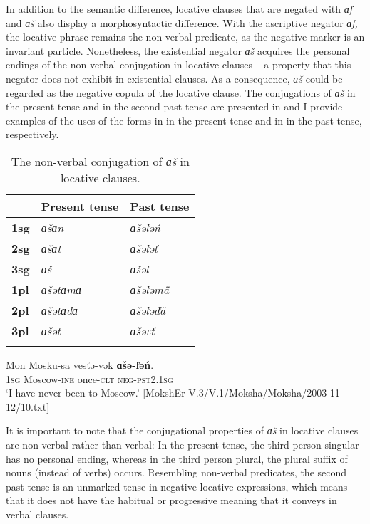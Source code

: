 \documentclass[output=paper]{langsci/langscibook}
\begin{document}
  In addition to the semantic difference, locative clauses that are negated with \textit{ɑf} and \textit{ɑš} also display a morphosyntactic difference. With the ascriptive negator \textit{ɑf,} the locative phrase remains the non-verbal predicate, as the negative marker is an invariant particle. Nonetheless, the existential negator \textit{ɑš} acquires the personal endings of the non-verbal conjugation in locative clauses -- a property that this negator does not exhibit in existential clauses. As a consequence, \textit{ɑš} could be regarded as the negative copula of the locative clause. The conjugations of \textit{ɑš} in the present tense and in the second past tense are presented in  and I provide examples of the uses of the forms in  in the present tense and in  in the past tense, respectively.

\begin{table}
\caption{The non-verbal conjugation of \textit{ɑš} in locative clauses.}
\label{tab:2:5}
\begin{tabularx}{.5\textwidth}{l Q Q}
\lsptoprule
			&\textbf{Present tense}	&\textbf{Past tense}\\
\midrule
\textbf{1sg}	&\textit{ɑšɑn}			&\textit{ɑšəľəń}\\
\textbf{2sg}	&\textit{ɑšɑt}			&\textit{ɑšəľəť}\\
\textbf{3sg}	&\textit{ɑš}			&\textit{ɑšəľ}\\
\textbf{1pl}	&\textit{ɑšətɑmɑ}		&\textit{ɑšəľəmä}\\
\textbf{2pl}	&\textit{ɑšətɑdɑ}		&\textit{ɑšəľəďä}\\
\textbf{3pl}	&\textit{ɑšət}			&\textit{ɑšə\textsc{ľ}ť}\\
\lspbottomrule
\end{tabularx}
\end{table}

\ea\label{ex:moksha-never-Moscow}
\gll Mon Mosku-sa vesťə-vək \textbf{ɑšə-ľəń}.\\
\textsc{1sg} Moscow-\textsc{ine} once-\textsc{clt} \textsc{neg-pst2.1sg}\\
\glt `I have never been to Moscow.' [MokshEr-V.3/V.1/Moksha/Moksha/2003-11-12/10.txt]
\z

It is important to note that the conjugational properties of \textit{ɑš}
in locative clauses are non-verbal rather than verbal: In the present
tense, the third person singular has no personal ending, whereas in the
third person plural, the plural suffix of nouns (instead of verbs)
occurs. Resembling non-verbal predicates, the second past tense is an
unmarked tense in negative locative expressions, which means that it does
not have the habitual or progressive meaning that it conveys in verbal clauses.
\end{document}
